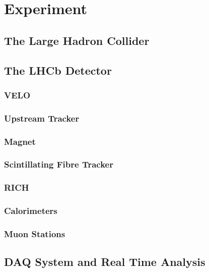 
\chapter{Experiment}
\label{chp:experiment}
\section{The Large Hadron Collider}

\section{The LHCb Detector}
\subsection{VELO}
\subsection{Upstream Tracker}
\subsection{Magnet}
\subsection{Scintillating Fibre Tracker}
\subsection{RICH}
\subsection{Calorimeters}
\subsection{Muon Stations}
\section{DAQ System and Real Time Analysis}

\subsection{}


